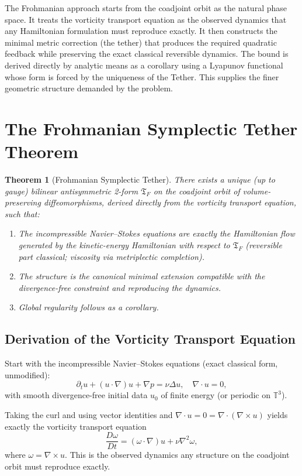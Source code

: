 \documentclass[11pt,a4paper]{article}
\newtheorem{theorem}{Theorem}
\begin{document}
The Frohmanian approach starts from the coadjoint orbit as the natural phase space. It treats the vorticity transport equation as the observed dynamics that any Hamiltonian formulation must reproduce exactly. It then constructs the minimal metric correction (the tether) that produces the required quadratic feedback while preserving the exact classical reversible dynamics. The bound is derived directly by analytic means as a corollary using a Lyapunov functional whose form is forced by the uniqueness of the Tether. This supplies the finer geometric structure demanded by the problem.

\section{The Frohmanian Symplectic Tether Theorem}

\begin{theorem}[Frohmanian Symplectic Tether]
There exists a unique (up to gauge) bilinear antisymmetric 2-form \(\mathfrak{T}_F\) on the coadjoint orbit of volume-preserving diffeomorphisms, derived directly from the vorticity transport equation, such that:
\begin{enumerate}
\item The incompressible Navier--Stokes equations are exactly the Hamiltonian flow generated by the kinetic-energy Hamiltonian with respect to \(\mathfrak{T}_F\) (reversible part classical; viscosity via metriplectic completion).
\item The structure is the canonical minimal extension compatible with the divergence-free constraint and reproducing the dynamics.
\item Global regularity follows as a corollary.
\end{enumerate}
\end{theorem}

\subsection{Derivation of the Vorticity Transport Equation}
Start with the incompressible Navier--Stokes equations (exact classical form, unmodified):
\[
\partial_t u + (u \cdot \nabla)u + \nabla p = \nu\Delta u, \quad \nabla \cdot u = 0,
\]
with smooth divergence-free initial data \(u_0\) of finite energy (or periodic on \(\mathbb{T}^3\)).

Taking the curl and using vector identities and \(\nabla \cdot u = 0 = \nabla \cdot (\nabla \times u)\) yields exactly the vorticity transport equation
\[
\frac{D\omega}{Dt} = (\omega \cdot \nabla)u + \nu\nabla^2\omega,
\]
where \(\omega = \nabla \times u\). This is the observed dynamics any structure on the coadjoint orbit must reproduce exactly.
\end{document}
